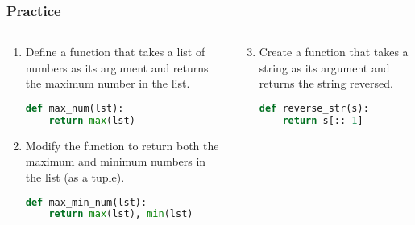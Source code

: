 \begin{frame}[fragile]
  \frametitle{Practice}
  \begin{columns}[T]
   \begin{column}{0.5\textwidth}
    \begin{enumerate}
     \item Define a function that takes a list of numbers as its argument and returns the maximum number in the list.\pause
     \begin{lstlisting}[language=Python, basicstyle=\scriptsize]
def max_num(lst):
    return max(lst)
     \end{lstlisting}
    \end{enumerate}
    \pause
    \begin{enumerate}
       \setcounter{enumi}{1}
     \item Modify the function to return both the maximum and minimum numbers in the list (as a tuple).\pause
     \begin{lstlisting}[language=Python, basicstyle=\scriptsize]
def max_min_num(lst):
    return max(lst), min(lst)
     \end{lstlisting}
    \end{enumerate}
   \end{column}
   \pause
   \begin{column}{0.5\textwidth}
    \begin{enumerate}
       \setcounter{enumi}{2}
     \item Create a function that takes a string as its argument and returns the string reversed.\pause
     \begin{lstlisting}[language=Python, basicstyle=\scriptsize]
def reverse_str(s):
    return s[::-1]
     \end{lstlisting}
    \end{enumerate}
   \end{column}
  \end{columns}
 \end{frame}

 

